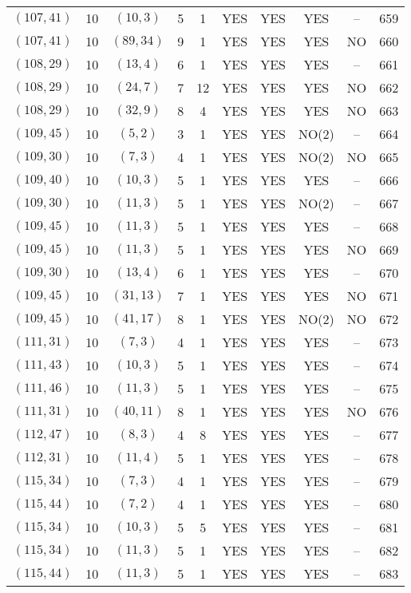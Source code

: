 \begin{longtable}{|c|c|c|c|c|c|c|c|c|c|}
$(107, 41)$ & 10 & $(10, 3)$ & 5 & 1 & YES & YES & YES & -- & 659\\
$(107, 41)$ & 10 & $(89, 34)$ & 9 & 1 & YES & YES & YES & NO & 660\\
$(108, 29)$ & 10 & $(13, 4)$ & 6 & 1 & YES & YES & YES & -- & 661\\
$(108, 29)$ & 10 & $(24, 7)$ & 7 & 12 & YES & YES & YES & NO & 662\\
$(108, 29)$ & 10 & $(32, 9)$ & 8 & 4 & YES & YES & YES & NO & 663\\
$(109, 45)$ & 10 & $(5, 2)$ & 3 & 1 & YES & YES & NO(2) & -- & 664\\
$(109, 30)$ & 10 & $(7, 3)$ & 4 & 1 & YES & YES & NO(2) & NO & 665\\
$(109, 40)$ & 10 & $(10, 3)$ & 5 & 1 & YES & YES & YES & -- & 666\\
$(109, 30)$ & 10 & $(11, 3)$ & 5 & 1 & YES & YES & NO(2) & -- & 667\\
$(109, 45)$ & 10 & $(11, 3)$ & 5 & 1 & YES & YES & YES & -- & 668\\
$(109, 45)$ & 10 & $(11, 3)$ & 5 & 1 & YES & YES & YES & NO & 669\\
$(109, 30)$ & 10 & $(13, 4)$ & 6 & 1 & YES & YES & YES & -- & 670\\
$(109, 45)$ & 10 & $(31, 13)$ & 7 & 1 & YES & YES & YES & NO & 671\\
$(109, 45)$ & 10 & $(41, 17)$ & 8 & 1 & YES & YES & NO(2) & NO & 672\\
$(111, 31)$ & 10 & $(7, 3)$ & 4 & 1 & YES & YES & YES & -- & 673\\
$(111, 43)$ & 10 & $(10, 3)$ & 5 & 1 & YES & YES & YES & -- & 674\\
$(111, 46)$ & 10 & $(11, 3)$ & 5 & 1 & YES & YES & YES & -- & 675\\
$(111, 31)$ & 10 & $(40, 11)$ & 8 & 1 & YES & YES & YES & NO & 676\\
$(112, 47)$ & 10 & $(8, 3)$ & 4 & 8 & YES & YES & YES & -- & 677\\
$(112, 31)$ & 10 & $(11, 4)$ & 5 & 1 & YES & YES & YES & -- & 678\\
$(115, 34)$ & 10 & $(7, 3)$ & 4 & 1 & YES & YES & YES & -- & 679\\
$(115, 44)$ & 10 & $(7, 2)$ & 4 & 1 & YES & YES & YES & -- & 680\\
$(115, 34)$ & 10 & $(10, 3)$ & 5 & 5 & YES & YES & YES & -- & 681\\
$(115, 34)$ & 10 & $(11, 3)$ & 5 & 1 & YES & YES & YES & -- & 682\\
$(115, 44)$ & 10 & $(11, 3)$ & 5 & 1 & YES & YES & YES & -- & 683\\

\end{longtable}
